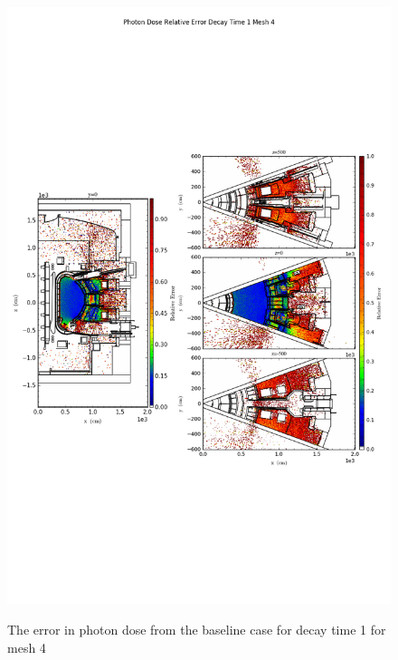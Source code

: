 \begin{figure}[ht!]
\centering
\includegraphics[trim={0cm 9cm 0cm 10cm},clip,scale=0.75]{../plots/final_model_nob4c/Photon_Dose_Relative_Error_Decay_Time_1_Mesh_4.png}
\label{fig:photons_dc1_no4bc_m4_error}
\caption{The error in photon dose from the baseline case for decay time 1 for mesh 4}
\end{figure}
